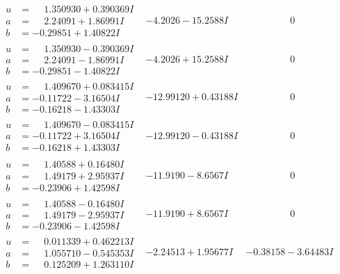 \documentclass[1p]{elsarticle_modified}
\theoremstyle{definition}
\begin{document}
$$\begin{array}{c|c|c}
\begin{aligned}
u &= \phantom{-}1.350930 + 0.390369 I \\
a &= \phantom{-}2.24091 + 1.86991 I \\
b &= -0.29851 + 1.40822 I\end{aligned}
 & -4.2026 - 15.2588 I & \phantom{-0.000000 } 0 \\ \hline\begin{aligned}
u &= \phantom{-}1.350930 - 0.390369 I \\
a &= \phantom{-}2.24091 - 1.86991 I \\
b &= -0.29851 - 1.40822 I\end{aligned}
 & -4.2026 + 15.2588 I & \phantom{-0.000000 } 0 \\ \hline\begin{aligned}
u &= \phantom{-}1.409670 + 0.083415 I \\
a &= -0.11722 - 3.16504 I \\
b &= -0.16218 - 1.43303 I\end{aligned}
 & -12.99120 + 0.43188 I & \phantom{-0.000000 } 0 \\ \hline\begin{aligned}
u &= \phantom{-}1.409670 - 0.083415 I \\
a &= -0.11722 + 3.16504 I \\
b &= -0.16218 + 1.43303 I\end{aligned}
 & -12.99120 - 0.43188 I & \phantom{-0.000000 } 0 \\ \hline\begin{aligned}
u &= \phantom{-}1.40588 + 0.16480 I \\
a &= \phantom{-}1.49179 + 2.95937 I \\
b &= -0.23906 + 1.42598 I\end{aligned}
 & -11.9190 - 8.6567 I & \phantom{-0.000000 } 0 \\ \hline\begin{aligned}
u &= \phantom{-}1.40588 - 0.16480 I \\
a &= \phantom{-}1.49179 - 2.95937 I \\
b &= -0.23906 - 1.42598 I\end{aligned}
 & -11.9190 + 8.6567 I & \phantom{-0.000000 } 0 \\ \hline\begin{aligned}
u &= \phantom{-}0.011339 + 0.462213 I \\
a &= \phantom{-}1.055710 - 0.545353 I \\
b &= \phantom{-}0.125209 + 1.263110 I\end{aligned}
 & -2.24513 + 1.95677 I & -0.38158 - 3.64483 I \\ \hline\begin{aligned}

\end{aligned}
\end{array}$$
\end{document}

